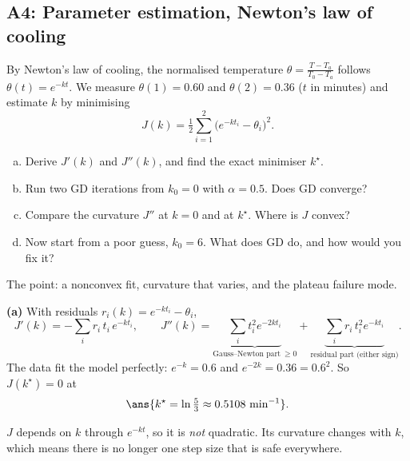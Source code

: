 \subsection{A4: Parameter estimation, Newton's law of cooling}

\begin{frame}{}
  \begin{probbox}
    By Newton's law of cooling, the normalised temperature $\theta = \frac{T - T_a}{T_0 - T_a}$ follows
    $\theta(t) = e^{-kt}$. We measure $\theta(1) = 0.60$ and $\theta(2) = 0.36$ ($t$ in minutes) and estimate $k$ by minimising
    \[
      J(k) = \tfrac12\sum_{i=1}^{2}\bigl(e^{-kt_i} - \theta_i\bigr)^2 .
    \]
    \vspace{-8pt}
    \begin{enumerate}[(a)]
      \item Derive $J'(k)$ and $J''(k)$, and find the exact minimiser $k^\star$.
      \item Run two GD iterations from $k_0 = 0$ with $\alpha = 0.5$. Does GD converge?
      \item Compare the curvature $J''$ at $k = 0$ and at $k^\star$. Where is $J$ convex?
      \item Now start from a poor guess, $k_0 = 6$. What does GD do, and how would you fix it?
    \end{enumerate}
  \end{probbox}
  \footnotesize\textcolor{mGrey}{The point: a nonconvex fit, curvature that varies, and the plateau failure mode.}
\end{frame}

\begin{frame}{}
  \textbf{(a)} With residuals $r_i(k) = e^{-kt_i} - \theta_i$,
  \[
    J'(k) = -\sum_i r_i\,t_i\,e^{-kt_i}, \qquad
    J''(k) = \underbrace{\sum_i t_i^2 e^{-2kt_i}}_{\text{Gauss--Newton part} \ \ge 0}
           + \underbrace{\sum_i r_i\,t_i^2 e^{-kt_i}}_{\text{residual part (either sign)}}.
  \]
  The data fit the model perfectly: $e^{-k} = 0.6$ and $e^{-2k} = 0.36 = 0.6^2$. So $J(k^\star) = 0$ at
  \[
    \ans{k^\star = \ln\tfrac53 \approx 0.5108\ \text{min}^{-1}}.
  \]
  \vspace{-4pt}
  \begin{keybox}
    $J$ depends on $k$ through $e^{-kt}$, so it is \emph{not} quadratic. Its curvature changes with $k$,
    which means there is no longer one step size that is safe everywhere.
  \end{keybox}
\end{frame}

